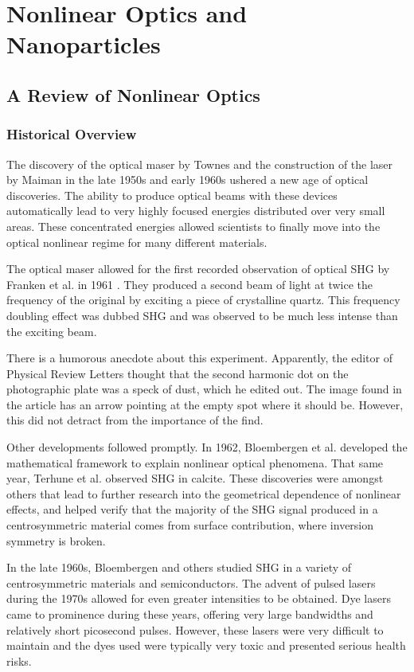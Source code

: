 \chapter{Nonlinear Optics and Nanoparticles}\label{chap_theory}
\minitoc
\section{A Review of Nonlinear Optics}
\subsection{Historical Overview}\label{chap_theory_hist}
The discovery of the optical maser by Townes \cite{PhysRev.112.1940} and the construction of the laser by Maiman in the late 1950s and early 1960s ushered a new age of optical discoveries. The ability to produce optical beams with these devices automatically lead to very highly focused energies distributed over very small areas. These concentrated energies allowed scientists to finally move into the optical nonlinear regime for many different materials.

The optical maser allowed for the first recorded observation of optical SHG by Franken et al. in 1961 \cite{PhysRevLett.7.118}. They produced a second beam of light at twice the frequency of the original by exciting a piece of crystalline quartz. This frequency doubling effect was dubbed SHG and was observed to be much less intense than the exciting beam.

There is a humorous anecdote about this experiment. Apparently, the editor of Physical Review Letters thought that the second harmonic dot on the photographic plate was a speck of dust, which he edited out. The image found in the article has an arrow pointing at the empty spot where it should be. However, this did not detract from the importance of the find.

Other developments followed promptly. In 1962, Bloembergen et al. \cite{PhysRev.127.1918, PhysRev.128.606} developed the mathematical framework to explain nonlinear optical phenomena. That same year, Terhune et al. \cite{PhysRevLett.8.404} observed SHG in calcite. These discoveries were amongst others \cite{lax1962nonlinear} that lead to further research into the geometrical dependence of nonlinear effects, and helped verify that the majority of the SHG signal produced in a centrosymmetric material comes from surface contribution, where inversion symmetry is broken.

In the late 1960s, Bloembergen \cite{PhysRev.174.813} and others \cite{PhysRev.178.1218} studied SHG in a variety of centrosymmetric materials and semiconductors. The advent of pulsed lasers during the 1970s \cite{nla.cat-vn2583352} allowed for even greater intensities to be obtained. Dye lasers came to prominence during these years, offering very large bandwidths and relatively short picosecond pulses. However, these lasers were very difficult to maintain and the dyes used were typically very toxic and presented serious health risks.

